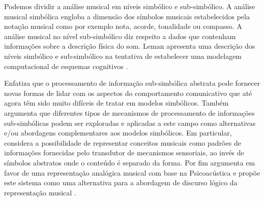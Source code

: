 \documentclass{ppgmus}
\begin{document}

Podemos dividir a análise musical em níveis simbólico e sub-simbólico.
A análise musical simbólica engloba a dimensão dos símbolos musicais
estabelecidos pela notação musical como por exemplo nota, acorde, tonalidade ou compasso.
A análise musical no nível sub-simbólico diz respeito a dados que contenham informações sobre a 
descrição física do som. Leman apresenta uma descrição dos níveis simbólico e sub-simbólico 
na tentativa de estabelecer uma modelagem
computacional de esquemas cognitivos \cite{leman89}.

Enfatiza que o processamento de informação sub-simbólica abstrata pode fornecer novas formas de lidar com os aspectos
do comportamento comunicativo que até agora têm sido muito difíceis de tratar em modelos simbólicos.
Também argumenta que diferentes tipos de mecanismos de processamento de informações sub-simbólicas podem ser exploradas
e aplicadas a este campo como alternativas e/ou abordagens complementares aos modelos simbólicos.
Em particular, considera a possibilidade de representar conceitos musicais como padrões de
informações fornecidas pelo transdutor de mecanismos sensoriais, ao invés de símbolos abstratos onde o conteúdo
é separado da forma. Por fim argumenta em favor de uma representação analógica musical
com base na Psicoacústica e propõe este sistema como uma alternativa para a abordagem de discurso lógico da representação musical \cite{leman89}.
\end{document}
